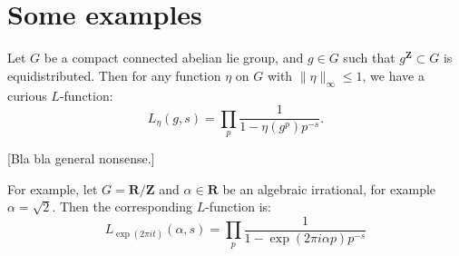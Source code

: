 \documentclass{article}
\newcommand{\bR}{\mathbf{R}}
\newcommand{\bZ}{\mathbf{Z}}
\theoremstyle{definition}
\begin{document}
\section{Some examples}

Let $G$ be a compact connected abelian lie group, and $g\in G$ such that 
$g^\bZ\subset G$ is equidistributed. Then for any function $\eta$ on $G$ with 
$\|\eta\|_\infty\leqslant 1$, we have a curious $L$-function:
\[
	L_\eta(g,s) = \prod_p \frac{1}{1-\eta(g^p) p^{-s}} .
\]

[Bla bla general nonsense.]

For example, let $G=\bR/\bZ$ and $\alpha\in \bR$ be an algebraic irrational, 
for example $\alpha=\sqrt 2$. Then the corresponding $L$-function is:
\[
	L_{\exp(2\pi it)}(\alpha,s) = \prod_p \frac{1}{1-\exp(2\pi i \alpha p) p^{-s}}
\]





\printbibliography
\end{document}
